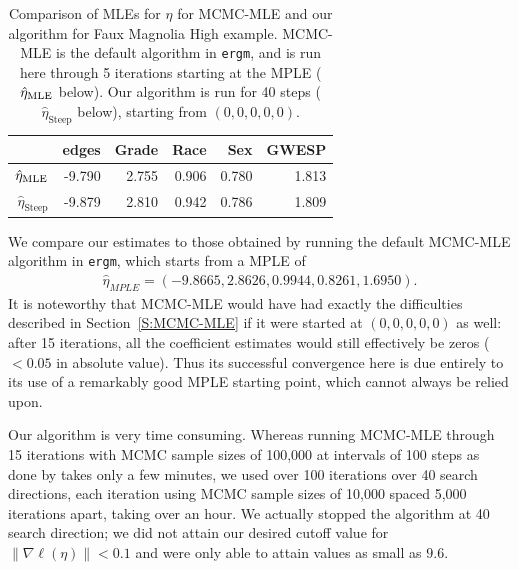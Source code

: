 \begin{table}[h]  
\begin{center} 
\caption[Comparison of MLEs for $\eta$ for MCMC-MLE and our algorithm for Faux Magnolia High example]{Comparison of MLEs for $\eta$ for MCMC-MLE and our algorithm for Faux Magnolia High example.  MCMC-MLE is the default algorithm
in \texttt{ergm}, and is run here through 5 iterations starting
at the MPLE ($\hat{\eta}_{\textrm{MLE}}$ below).
Our algorithm is run for 40 steps ($\hat{\eta}_{\textrm{Steep}}$ below),
starting from $(0,0,0,0,0)$.}
\begin{tabular}{rrrrrr}
  \hline
 & edges & Grade & Race & Sex & GWESP \\ 
  \hline
$\hat{\eta}_{\textrm{MLE}}$ & -9.790 & 2.755 & 0.906 & 0.780 & 1.813 \\ 
$\hat{\eta}_{\textrm{Steep}}$ & -9.879 & 2.810 & 0.942 & 0.786 & 1.809 \\ 
   \hline
\end{tabular}\label{T:FauxMagnolia}
\end{center}
\end{table}

We compare our estimates to those obtained by running the default MCMC-MLE algorithm 
in \texttt{ergm}, which starts from a MPLE of
\begin{align*}
	\hat{\eta}_{MPLE } = ( -9.8665, 2.8626, 0.9944, 0.8261, 1.6950 ).
\end{align*}
It is noteworthy that MCMC-MLE would have had exactly the difficulties 
described in Section~\ref{S:MCMC-MLE} if it were started at $(0, 0, 0, 0, 0)$ 
as well:
after 15 iterations, all the coefficient estimates would still effectively be zeros
($< 0.05$ in absolute value).
Thus its successful convergence here is due entirely to its use of 
a remarkably good MPLE starting point, which cannot always be relied upon.

Our algorithm is very time consuming.  Whereas running MCMC-MLE through 15 iterations with MCMC sample sizes of 100,000 at intervals of 100 steps as done 
by \citet{statnet-tutorial} takes only a few minutes, 
we used over 100 iterations over 40 search directions, 
each iteration using MCMC sample sizes of 
10,000 spaced 5,000 iterations apart, taking over an hour.  We actually stopped the 
algorithm at 40 search direction; we did not attain our desired cutoff value for 
$\lVert \nabla \ell(\eta) \rVert < 0.1$ and were only able to 
attain values as small as $9.6$.
 

